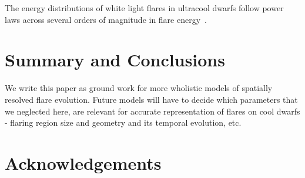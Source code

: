 \documentclass[fleqn,usenatbib,letters]{mnras}%
\begin{document}
The energy distributions of white light flares in ultracool dwarfs follow power laws across several orders of magnitude in flare energy~\citep{gizis2017b, paudel2018}.
%
\section{Summary and Conclusions}
\label{sec:summary}

We write this paper as ground work for more wholistic models of spatially resolved flare evolution. Future models will have to decide which parameters that we neglected here, are relevant for accurate representation of flares on cool dwarfs - flaring region size and geometry and its temporal evolution, etc. 
\section*{Acknowledgements}
\end{document}
